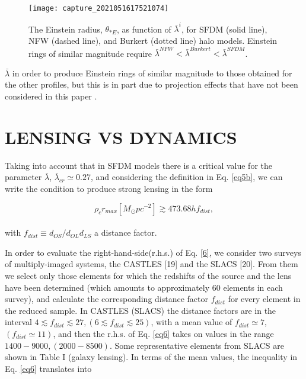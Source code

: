 \documentclass[10pt,a4paper]{article}
\begin{document}
\begin{multicols}{2}
\begin{figure}[H]
\centering
\texttt{[image: capture\_2021051617521074]} 
\caption{The Einstein radius, $\theta_{\ast E}$, as function of $\bar{\lambda}^i$, for SFDM (solid line), NFW (dashed line), and Burkert (dotted line) halo models. Einstein rings of similar magnitude require $\bar{\lambda}^{NFW}<\bar{\lambda}^{Burkert} < \bar{\lambda}^{SFDM}$.
}
\end{figure}
 
$\bar{\lambda}$ in order to produce Einstein rings of similar magnitude to those obtained for the other profiles, but this is in part due to projection effects that have not been considered in this paper \cite{Kling_2008}.

\section{LENSING VS DYNAMICS}

Taking into account that in SFDM models there is a critical value for the parameter $\bar{\lambda}$, $\bar{\lambda}_{cr} \simeq 0.27$, and considering the definition in Eq. \eqref{eq5b}, we can write the condition to produce strong lensing in the form

\begin{equation} \label{eq6}
\rho_{c}r_{max}[M_{\odot}pc^{-2}] \gtrsim 473.68hf_{dist},
\end{equation}
\\
with $f_{dist}\equiv d_{OS}/d_{OL}d_{LS}$ a distance factor.\

In order to evaluate the right-hand-side(r.h.s.) of Eq. \eqref{6}, we consider two surveys of multiply-imaged systems, the CASTLES [19] and the SLACS [20]. From them we select only those elements for which the redshifts of the source and the lens have been determined (which amounts to approximately 60 elements in each survey), and calculate the corresponding distance factor $f_{dist}$ for every element in the reduced sample. In CASTLES (SLACS) the distance factors are in the interval $4\lesssim f_{dist} \lesssim 27, (6\lesssim f_{dist} \lesssim 25)$, with a mean value of $f_{dist} \simeq 7$, $(f_{dist} \simeq 11)$, and then the r.h.s. of Eq. \eqref{eq6} takes on values in the range $1400 - 9000, (2000 - 8500)$. Some representative elements from SLACS are shown in Table I (galaxy lensing). In terms of the mean values, the inequality in Eq. \eqref{eq6} translates into


\end{multicols}
\end{document}
